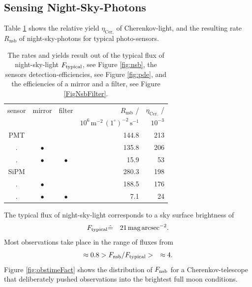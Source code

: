 \documentclass{article}%
\begin{document}
\begin{multicols}{2}
\section*{Sensing Night-Sky-Photons}%
\label{sec:nsb}%
%
Table \ref{TabFilters} shows the relative yield $\eta_\text{Cer.}$ of Cherenkov-light, and the resulting rate $R_\text{nsb}$ of night-sky-photons for typical photo-sensors.
%
\begin{table}[H]
  \begin{center}
    \begin{tabular}{cccrr}
%
        \footnotesize{sensor} &
        \footnotesize{mirror} &
        \footnotesize{filter} &
        $R_\text{nsb}$ /   &
        $\eta_\text{Cer.}$ / \\
%
        &
        &
        &
        \footnotesize{$10^6\,\text{m}^{-2}\,(1^\circ)^{-2}\,\text{s}^{-1}$} &
        \footnotesize{$10^{-3}$} \\
%
        \hline
        PMT &             &             & 144.8 & 213\\
        .   & $\bullet{}$ &             & 135.8 & 206\\
        .   & $\bullet{}$ & $\bullet{}$ &  15.9 &  53\\
        \hline
        SiPM &             &             & 280.3 & 198\\
        .    & $\bullet{}$ &             & 188.5 & 176\\
        .    & $\bullet{}$ & $\bullet{}$ &   7.1 &  24\\
    \end{tabular}
    \caption{
The rates and yields result out of the typical flux of night-sky-light $F_\text{typical}{}$, see Figure \ref{fig:nsb}, the sensors detection-efficiencies, see Figure \ref{fig:pde}, and the efficiencies of a  mirror and a filter, see Figure \ref{FigNsbFilter}.
    }
    \label{TabFilters}
  \end{center}
\end{table}
%
The typical flux of night-sky-light corresponds to a sky surface brightness of
%
\begin{eqnarray*}
F_\text{typical}{} &\hat{=}& 21\,\text{mag}\,\text{arcsec}^{-2}.
\end{eqnarray*}
%
Most observations take place in the range of fluxes from
\begin{eqnarray*}
\approx{}0.8 &> F_\text{nsb}{} / F_\text{typical}{} >& \approx{}4.
\end{eqnarray*}
%
Figure \ref{fig:obstimeFact} shows the distribution of $F_\text{nsb}{}$ for a Cherenkov-telescope that deliberately pushed observations into the brightest full moon conditions.

\end{multicols}
\end{document}
